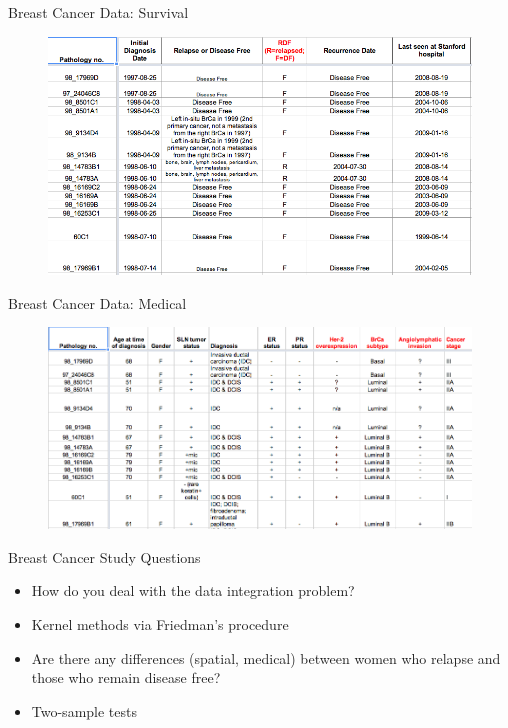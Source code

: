 \documentclass{beamer}
\begin{document}
\begin{frame}{Breast Cancer Data: Survival}
  \begin{figure}
    \centering
    \includegraphics[scale=.5]{survival.png}
  \end{figure}
\end{frame}

\begin{frame}{Breast Cancer Data: Medical}
  \begin{figure}
    \centering
    \includegraphics[scale=.5]{medical.png}
  \end{figure}
\end{frame}

\begin{frame}{Breast Cancer Study Questions}
  \begin{itemize}
  \item How do you deal with the data integration problem? \pause
  \item Kernel methods via Friedman's procedure \pause
  \item Are there any differences (spatial, medical) between women who
    relapse and those who remain disease free? \pause
  \item Two-sample tests
  \end{itemize}
\end{frame}
\end{document}
